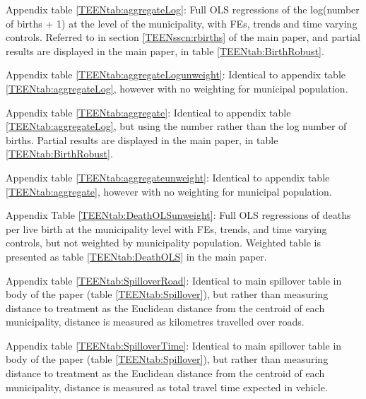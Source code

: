 \documentclass[11pt,subeqn]{article}
\begin{document}
\begin{spacing}{1.4}
\noindent Appendix table \ref{TEENtab:aggregateLog}: Full OLS regressions 
of the log(number of births + 1) at the level of the municipality, with
FEs, trends and time varying controls.  Referred to in section 
\ref{TEENsscn:rbirths} of the main paper, and partial results are
displayed in the main paper, in table 
\ref{TEENtab:BirthRobust}.

\noindent Appendix table \ref{TEENtab:aggregateLogunweight}: Identical
to appendix table \ref{TEENtab:aggregateLog}, however with no weighting
for municipal population.

\noindent Appendix table \ref{TEENtab:aggregate}: Identical to appendix
table \ref{TEENtab:aggregateLog}, but using the number rather than the log
number of births.  Partial results are displayed in the main paper, in 
table \ref{TEENtab:BirthRobust}.

\noindent Appendix table \ref{TEENtab:aggregateunweight}: Identical
to appendix table \ref{TEENtab:aggregate}, however with no weighting
for municipal population.

\noindent Appendix Table \ref{TEENtab:DeathOLSunweight}: Full OLS
regressions of deaths per live birth at the municipality level with FEs,
trends, and time varying controls, but not weighted by municipality
population. Weighted table is presented as table \ref{TEENtab:DeathOLS}
in the main paper.


\noindent Appendix table \ref{TEENtab:SpilloverRoad}: Identical to main 
spillover table in body of the paper (table \ref{TEENtab:Spillover}), but 
rather than measuring distance to treatment as the Euclidean distance from 
the centroid of each municipality, distance is measured as kilometres 
travelled over roads.

\noindent Appendix table \ref{TEENtab:SpilloverTime}: Identical to main 
spillover table in body of the paper (table \ref{TEENtab:Spillover}), but 
rather than measuring distance to treatment as the Euclidean distance from 
the centroid of each municipality, distance is measured as total travel time
expected in vehicle.



\end{spacing}
\end{document}
